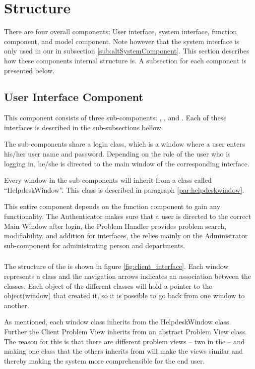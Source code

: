 \section{Structure}
There are four overall components: User interface, system interface, function component, and model component.
Note however that the system interface is only used in our  in subsection \ref{sub:altSystemComponent}.
This section describes how these components internal structure is.
A subsection for each component is presented below.

\subsection{User Interface Component}
This component consists of three sub-components: \cinterface[], \sinterface[], and \ainterface[].
Each of these interfaces is described in the sub-subsections bellow.

The sub-components share a login class, which is a window where a user enters his/her user name and password.
Depending on the role of the user who is logging in, he/she is directed to the main window of the corresponding interface.

Every window in the sub-components will inherit from a class called ``HelpdeskWindow''.
This class is described in paragraph \ref{par:helpdeskwindow}.

This entire component depends on the function component to gain any functionality. The Authenticator makes sure that a user is directed to the correct Main Window after login, the Problem Handler provides problem search, modifiability, and addition for interfaces, the \ainterface[] relies mainly on the Administrator sub-component for administrating person and departments.

\subsubsection{\cinterface[]}
The structure of the \cinterface[] is shown in figure \ref{fig:client_interface}.
Each window represents a class and the navigation arrows indicates an association between the classes.
Each object of the different classes will hold a pointer to the object(window) that created it, so it is possible to go back from one window to another.

As mentioned, each window class inherits from the HelpdeskWindow class.
Further the Client Problem View inherits from an abstract Problem View class. The reason for this is that there are different problem views -- two in the \sinterface[] -- and making one class that the others inherits from will make the views similar and thereby making the system more comprehensible for the end user.

